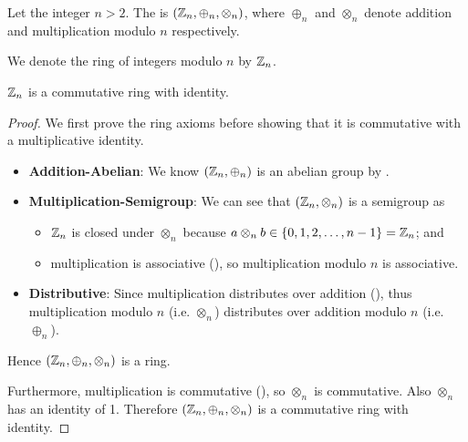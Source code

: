 \begin{definition}
    Let the integer $n > 2$. The  is $(\mathbb{Z}_n, \oplus_n, \otimes_n)$, where $\oplus_n$ and $\otimes_n$ denote addition and multiplication modulo $n$ respectively.
\end{definition}
\begin{remark}
    We denote the ring of integers modulo $n$ by $\mathbb{Z}_n$.
\end{remark}
\begin{proposition}
    $\mathbb{Z}_n$ is a commutative ring with identity.
\end{proposition}
\begin{proof}
    We first prove the ring axioms before showing that it is commutative with a multiplicative identity.
    \begin{itemize}
        \item \textbf{Addition-Abelian}: We know $(\mathbb{Z}_n, \oplus_n)$ is an abelian group by .
        \item \textbf{Multiplication-Semigroup}: We can see that $(\mathbb{Z}_n, \otimes_n)$ is a semigroup as
        \begin{itemize}
            \item $\mathbb{Z}_n$ is closed under $\otimes_n$ because $a \otimes_n b \in \{0, 1, 2, \dots, n-1\} = \mathbb{Z}_n$; and
            \item multiplication is associative (), so multiplication modulo $n$ is associative.
        \end{itemize}
        \item \textbf{Distributive}: Since multiplication distributes over addition (), thus multiplication modulo $n$ (i.e. $\otimes_n$) distributes over addition modulo $n$ (i.e. $\oplus_n$).
    \end{itemize}
    Hence $(\mathbb{Z}_n, \oplus_n, \otimes_n)$ is a ring.

    Furthermore, multiplication is commutative (), so $\otimes_n$ is commutative. Also $\otimes_n$ has an identity of 1. Therefore $(\mathbb{Z}_n, \oplus_n, \otimes_n)$ is a commutative ring with identity.
\end{proof}

